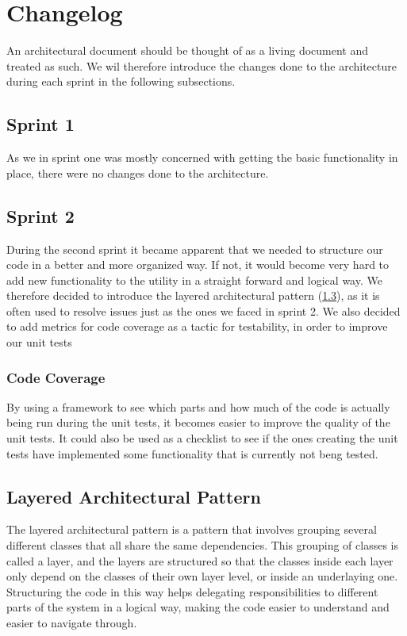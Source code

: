 \section{Changelog}
 An architectural document should be thought of as a living document and treated as such. We wil therefore introduce the changes done to the architecture during each sprint in the following subsections.

\subsection{Sprint 1}
As we in sprint one was mostly concerned with getting the basic functionality in place, there were no changes done to the architecture.

\subsection{Sprint 2}
During the second sprint it became apparent that we needed to structure our code in a better and more organized way. If not, it would become very hard to add new functionality to the \gls{utility} in a straight forward and logical way. We therefore decided to introduce the layered architectural pattern (\ref{sec:Layered}), as it is often used to resolve issues just as the ones we faced in sprint 2. We also decided to add metrics for code coverage as a tactic for testability, in order to improve our unit tests

\subsubsection{Code Coverage}
By using a framework to see which parts and how much of the code is actually being run during the unit tests, it becomes easier to improve the quality of the unit tests. It could also be used as a checklist to see if the ones creating the unit tests have implemented some functionality that is currently not beng tested.


\subsection{Layered Architectural Pattern}
\label{sec:Layered}
The layered architectural pattern is a pattern that involves grouping several different classes that all share the same dependencies. This grouping of classes is called a layer, and the layers are structured so that the classes inside each layer only depend on the classes of their own layer level, or inside an underlaying one. Structuring the code in this way helps delegating responsibilities to different parts of the system in a logical way, making the code easier to understand and easier to navigate through.

